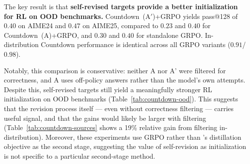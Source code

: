 The key result is that \textbf{self-revised targets provide a better
initialization for RL on OOD benchmarks.}  Countdown~(A$'$)+GRPO yields
pass@128 of $0.40$ on AIME24 and $0.47$ on AIME25, compared to $0.23$
and $0.40$ for Countdown~(A)+GRPO, and $0.30$ and $0.40$ for standalone
GRPO.  In-distribution Countdown performance is identical across all
GRPO variants ($0.91$/$0.98$).

 
 

Notably, this comparison is conservative: neither A nor A' were filtered for correctness, and A uses off-policy 
answers rather than the model's own attempts. Despite this, self-revised targets still yield a meaningfully stronger RL initialization on OOD benchmarks (Table~\ref{tab:countdown-ood}). This suggests that the revision process itself — even without correctness filtering — carries useful signal, and that the gains would likely be larger with filtering (Table~\ref{tab:countdown-sources} shows a 19\% relative gain from filtering in-distribution).
Moreover, these experiments use GRPO rather than \ours{}'s distillation objective as the second stage, suggesting the value of self-revision as initialization is not specific to a particular second-stage method.
 
